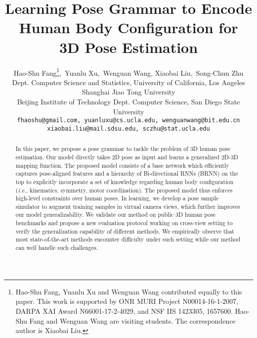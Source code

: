 \documentclass[letterpaper]{article} \usepackage{aaai18}  \usepackage{times}  \usepackage{helvet}  \usepackage{courier}  \usepackage{url}  \usepackage{color}
\begin{document}
\title{Learning Pose Grammar to Encode Human Body Configuration for\\ 3D Pose Estimation}
\author{Hao-Shu Fang\thanks{Hao-Shu Fang, Yuanlu Xu and Wenguan Wang contributed equally to this paper. This work is supported by ONR MURI Project N00014-16-1-2007, DARPA XAI Award N66001-17-2-4029, and NSF IIS 1423305, 1657600. Hao-Shu Fang and Wenguan Wang are visiting students. The correspondence author is Xiaobai Liu.},\, Yuanlu Xu,\, Wenguan Wang, Xiaobai Liu,\, Song-Chun Zhu\\
Dept. Computer Science and Statistics, University of California, Los Angeles\;\;\; Shanghai Jiao Tong University\\
Beijing Institute of Technology\;\;\; Dept. Computer Science, San Diego State University\\
{\tt\small fhaoshu@gmail.com, yuanluxu@cs.ucla.edu, wenguanwang@bit.edu.cn}\\
{\tt\small xiaobai.liu@mail.sdsu.edu, sczhu@stat.ucla.edu}
}

\maketitle

\begin{abstract}
In this paper, we propose a pose grammar to tackle the problem of 3D human pose estimation. Our model directly takes 2D pose as input and learns a generalized 2D-3D mapping function. The proposed model consists of a base network which efficiently captures pose-aligned features and a hierarchy of Bi-directional RNNs (BRNN) on the top to explicitly incorporate a set of knowledge regarding human body configuration (\textit{i.e.}, kinematics, symmetry, motor coordination). The proposed model thus enforces high-level constraints over human poses. In learning, we develop a pose sample simulator to augment training samples in virtual camera views, which further improves our model generalizability. We validate our method on public 3D human pose benchmarks and propose a new evaluation protocol working on cross-view setting to verify the generalization capability of different methods. We empirically observe that most state-of-the-art methods encounter difficulty under such setting while our method can well handle such challenges.
\end{abstract}

\maketitle
\end{document}
